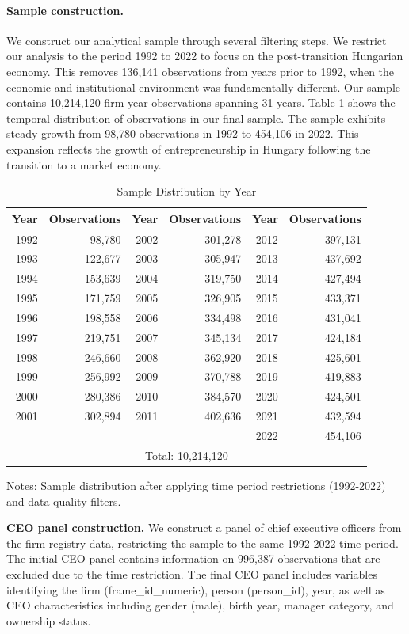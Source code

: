 \documentclass[11pt,a4paper]{article}
\begin{document}
\paragraph{Sample construction.} We construct our analytical sample through several filtering steps. We restrict our analysis to the period 1992 to 2022 to focus on the post-transition Hungarian economy. This removes 136,141 observations from years prior to 1992, when the economic and institutional environment was fundamentally different. Our sample contains 10,214,120 firm-year observations spanning 31 years. Table \ref{tab:sample} shows the temporal distribution of observations in our final sample. The sample exhibits steady growth from 98,780 observations in 1992 to 454,106 in 2022. This expansion reflects the growth of entrepreneurship in Hungary following the transition to a market economy.

\begin{table}[htbp]
\centering
\caption{Sample Distribution by Year}
\label{tab:sample}
\begin{tabular}{rr|rr|rr}
\toprule
Year & Observations & Year & Observations & Year & Observations \\
\midrule
1992 & 98,780 & 2002 & 301,278 & 2012 & 397,131 \\
1993 & 122,677 & 2003 & 305,947 & 2013 & 437,692 \\
1994 & 153,639 & 2004 & 319,750 & 2014 & 427,494 \\
1995 & 171,759 & 2005 & 326,905 & 2015 & 433,371 \\
1996 & 198,558 & 2006 & 334,498 & 2016 & 431,041 \\
1997 & 219,751 & 2007 & 345,134 & 2017 & 424,184 \\
1998 & 246,660 & 2008 & 362,920 & 2018 & 425,601 \\
1999 & 256,992 & 2009 & 370,788 & 2019 & 419,883 \\
2000 & 280,386 & 2010 & 384,570 & 2020 & 424,501 \\
2001 & 302,894 & 2011 & 402,636 & 2021 & 432,594 \\
 &  &  &  & 2022 & 454,106 \\
\midrule
\multicolumn{6}{c}{Total: 10,214,120} \\
\bottomrule
\end{tabular}
\footnotesize
Notes: Sample distribution after applying time period restrictions (1992-2022) and data quality filters.
\end{table}

\textbf{CEO panel construction.} We construct a panel of chief executive officers from the firm registry data, restricting the sample to the same 1992-2022 time period. The initial CEO panel contains information on 996,387 observations that are excluded due to the time restriction. The final CEO panel includes variables identifying the firm (frame\_id\_numeric), person (person\_id), year, as well as CEO characteristics including gender (male), birth year, manager category, and ownership status.
\end{document}
